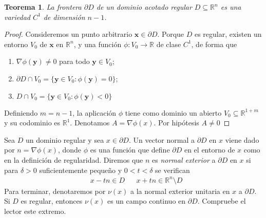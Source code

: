 \documentclass{report}
\newcommand{\realNumbers}{\mathbb{R}}
\newtheorem{theorem}{Teorema}
\theoremstyle{definition}
\theoremstyle{remark}
\begin{document}
  \begin{theorem}
    La frontera \(\partial D\) de un dominio acotado regular \(D \subseteq \realNumbers^n\) es una variedad \(C^1\) de dimensión \(n - 1\).
  \end{theorem}
  \begin{proof}
    Consideremos un punto arbitrario \(\mathbf{x} \in \partial D\).
    Porque \(D\) es regular, existen un entorno \(V_0\) de \(\mathbf{x}\) en \(\realNumbers^n\), y una función \(\phi : V_0 \rightarrow \realNumbers\) de clase \(C^1\), de forma que
    \begin{enumerate}
      \item \(\nabla \phi (\mathbf{y}) \neq 0\) para todo \(\mathbf{y} \in V_0\);
      \item \(\partial D \cap V_0 = \{\mathbf{y} \in V_0 : \phi(\mathbf{y}) = 0\}\);
      \item \(D \cap V_0 = \{\mathbf{y} \in V_0 : \phi(\mathbf{y}) < 0\}\)
    \end{enumerate}

    Definiendo \(m = n - 1\), la aplicación \(\phi\) tiene como dominio un abierto \(V_0 \subseteq \realNumbers^{1 + m}\) y su codominio es \(\realNumbers^1\).
    Denotamos \(A = \nabla \phi(x)\).
    Por hipótesis \(A \neq 0\)

  \end{proof}

  Sea \(D\) un dominio regular y sea \(x \in \partial D\).
  Un vector normal a \(\partial D\) en \(x\) viene dado por \(n = \nabla \phi(x)\), donde \(\phi\) es una función que define \(\partial D\) en el entorno de \(x\) como en la definición de regularidad.
  Diremos que \(n\) es \emph{normal exterior} a \(\partial D\) en \(x\) si para \(\delta > 0\) suficientemente pequeño y \(0 < t < \delta\) se verifican
  \begin{align}
    &x - t n \in D
    &&x + t n \in \realNumbers^n \setminus D
  \end{align}
  Para terminar, denotaremos por \(\nu(x)\) a la normal exterior unitaria en \(x\) a \(\partial D\).
  Si \(D\) es regular, entonces \(\nu(x)\) es un campo continuo en \(\partial D\).
  Compruebe el lector este extremo.
\end{document}
